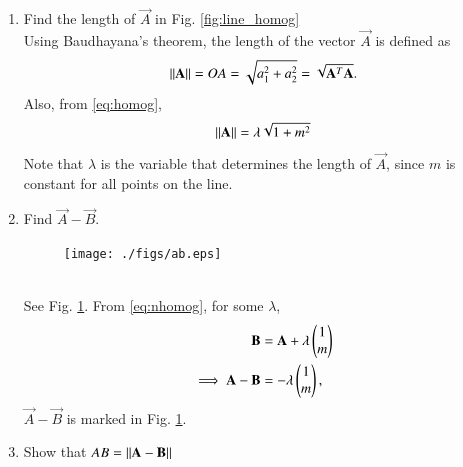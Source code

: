 \documentclass[journal,12pt,twocolumn]{IEEEtran}
\renewcommand\thesection{\arabic{section}}
\begin{document}
\begin{enumerate}[label=\thesection.\arabic*
,ref=\thesection.\theenumi]
\item Find the length of $\vec{A}$ in Fig. \ref{fig:line_homog}
\\
\solution Using Baudhayana's theorem, the length of the vector $\vec{A}$ is defined as
\begin{equation}
 \lVert\mathbf{A}\rVert = OA = \sqrt{a_1^2 + a_2^2}
=\sqrt{\mathbf{A}^T\mathbf{A}}.
\end{equation}
%
Also, from \eqref{eq:homog}, 
\begin{equation}
\lVert\mathbf{A}\rVert = \lambda \sqrt{1+m^2}
\end{equation}
%
Note that $\lambda$ is the variable that determines the length of $\vec{A}$, 
since $m$ is constant for all points on the line.
%
\item Find $\vec{A}-\vec{B}$.
\begin{figure}
\centering
\texttt{[image: ./figs/ab.eps]}
\caption{}
\label{fig:ab}
\end{figure}
%
\\
\solution See Fig. \ref{fig:ab}. From \eqref{eq:nhomog}, for some 
$\lambda$,
\begin{align}
\mathbf{B} &=\mathbf{A} + \lambda \begin{pmatrix}1 \\ m\end{pmatrix}
\\
\implies \mathbf{A} - \mathbf{B} &= - \lambda \begin{pmatrix}1 \\ m\end{pmatrix},
\end{align}
%
$\vec{A} - \vec{B}$ is marked in Fig. \ref{fig:ab}.
%
\item Show that $AB = \lVert\mathbf{A}-\mathbf{B}\rVert$
\end{enumerate}
%
\end{document}
